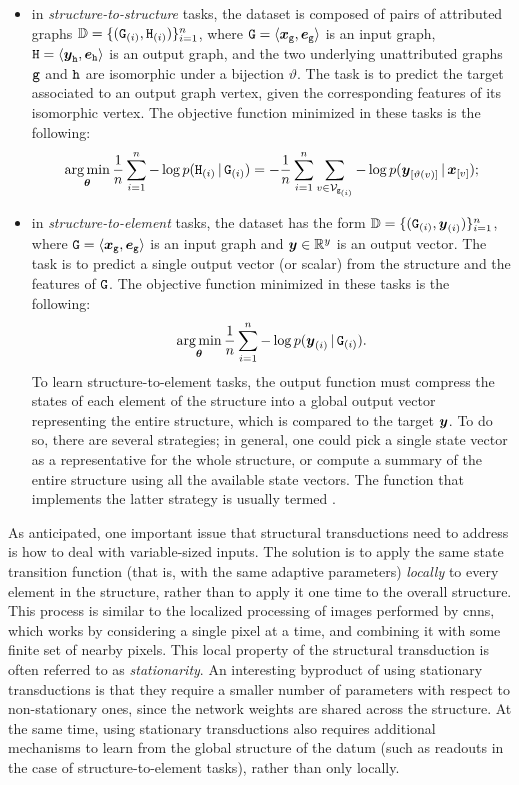 \begin{itemize}
    \item in \emph{structure-to-structure} tasks, the dataset is composed of pairs of attributed graphs $\Data = \{(\PatternGraph{g}{i}, \PatternGraph{h}{i})\}_{i=1}^n$, where $\AttrGraph{g} = \VectorGraph{x}{g}$ is an input graph, $\AttrGraph{h} = \VectorGraph{y}{h}$ is an output graph, and the two underlying unattributed graphs $\mathtt{g}$ and $\mathtt{h}$ are isomorphic under a bijection $\vartheta$. The task is to predict the target associated to an output graph vertex, given the corresponding features of its isomorphic vertex. The objective function minimized in these tasks is the following:
    $$\argmin_{\Param} \frac{1}{n} \sum_{i=1}^n -\log p(\PatternGraph{h}{i} \given \PatternGraph{g}{i}) = -\frac{1}{n} \sum_{i=1}^n \sum_{v \in \Nodes{g_{(i)}}} -\log p(\Elem{y}{\vartheta(v)} \given \Elem{x}{v});$$
    \item in \emph{structure-to-element} tasks, the dataset has the form  $\Data = \{(\PatternGraph{g}{i}, \PatternVector{y}{i})\}_{i=1}^n$, where $\AttrGraph{g} = \VectorGraph{x}{g}$ is an input graph and $\Vector{y} \in \Real^y$ is an output vector. The task is to predict a single output vector (or scalar) from the structure and the features of $\AttrGraph{g}$. The  objective function minimized in these tasks is the following:
    $$\argmin_{\Param} \frac{1}{n} \sum_{i=1}^n - \log p(\PatternVector{y}{i} \given \PatternGraph{g}{i}).$$
    To learn structure-to-element tasks, the output function must compress the states of each element of the structure into a global output vector representing the entire structure, which is compared to the target $\Vector{y}$. To do so, there are several strategies; in general, one could pick a single state vector as a representative for the whole structure, or compute a summary of the entire structure using all the available state vectors. The function that implements the latter strategy is usually termed .
\end{itemize}

As anticipated, one important issue that structural transductions need to address is how to deal with variable-sized inputs. The solution is to apply the same state transition function (that is, with the same adaptive parameters) \emph{locally} to every element in the structure, rather than to apply it one time to the overall structure. This process is similar to the localized processing of images performed by \glspl{cnn}, which works by considering a single pixel at a time, and combining it with some finite set of nearby pixels. This local property of the structural transduction is often referred to as \emph{stationarity}. An interesting byproduct of using stationary transductions is that they require a smaller number of parameters with respect to non-stationary ones, since the network weights are shared across the structure. At the same time, using stationary transductions also requires additional mechanisms to learn from the global structure of the datum (such as readouts in the case of structure-to-element tasks), rather than only locally.

